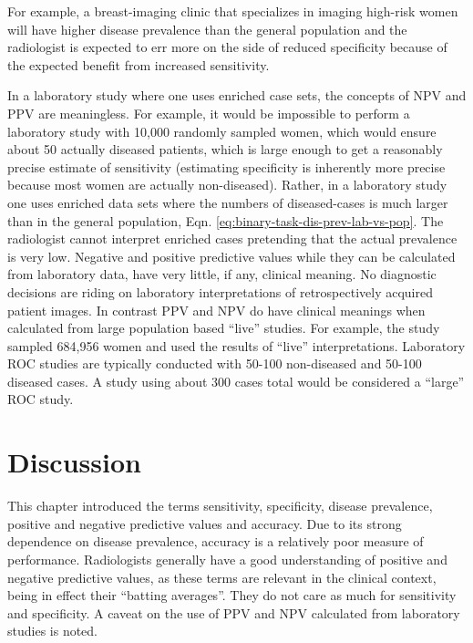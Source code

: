 \documentclass[
]{book}
\begin{document}
For example, a breast-imaging clinic that specializes in imaging high-risk women will have higher disease prevalence than the general population and the radiologist is expected to err more on the side of reduced specificity because of the expected benefit from increased sensitivity.

In a laboratory study where one uses enriched case sets, the concepts of \(\text{NPV}\) and \(\text{PPV}\) are meaningless. For example, it would be impossible to perform a laboratory study with 10,000 randomly sampled women, which would ensure about 50 actually diseased patients, which is large enough to get a reasonably precise estimate of sensitivity (estimating specificity is inherently more precise because most women are actually non-diseased). Rather, in a laboratory study one uses enriched data sets where the numbers of diseased-cases is much larger than in the general population, Eqn. \eqref{eq:binary-task-dis-prev-lab-vs-pop}. The radiologist cannot interpret enriched cases pretending that the actual prevalence is very low. Negative and positive predictive values while they can be calculated from laboratory data, have very little, if any, clinical meaning. No diagnostic decisions are riding on laboratory interpretations of retrospectively acquired patient images. In contrast \(\text{PPV}\) and \(\text{NPV}\) do have clinical meanings when calculated from large population based ``live'' studies. For example, the \citep{fenton2007influence} study sampled 684,956 women and used the results of ``live'' interpretations. Laboratory ROC studies are typically conducted with 50-100 non-diseased and 50-100 diseased cases. A study using about 300 cases total would be considered a ``large'' ROC study.

\hypertarget{binary-task-discussion}{%
\section{Discussion}\label{binary-task-discussion}}

This chapter introduced the terms sensitivity, specificity, disease prevalence, positive and negative predictive values and accuracy. Due to its strong dependence on disease prevalence, accuracy is a relatively poor measure of performance. Radiologists generally have a good understanding of positive and negative predictive values, as these terms are relevant in the clinical context, being in effect their ``batting averages''. They do not care as much for sensitivity and specificity. A caveat on the use of \(\text{PPV}\) and \(\text{NPV}\) calculated from laboratory studies is noted.
\end{document}

